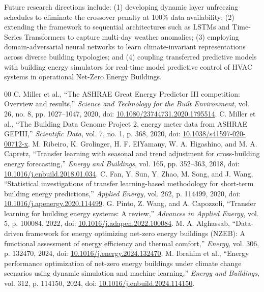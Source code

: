 \documentclass[conference]{IEEEtran}
\begin{document}
Future research directions include: (1) developing dynamic layer unfreezing schedules to eliminate the crossover penalty at 100\% data availability; (2) extending the framework to sequential architectures such as LSTMs and Time-Series Transformers to capture multi-day weather anomalies; (3) employing domain-adversarial neural networks to learn climate-invariant representations across diverse building typologies; and (4) coupling transferred predictive models with building energy simulators for real-time model predictive control of HVAC systems in operational Net-Zero Energy Buildings.

\small
\begin{thebibliography}{00}
 C. Miller et al., ``The ASHRAE Great Energy Predictor III competition: Overview and results,'' \textit{Science and Technology for the Built Environment}, vol. 26, no. 8, pp. 1027--1047, 2020, doi: \href{https://doi.org/10.1080/23744731.2020.1795514}{10.1080/23744731.2020.1795514}.
 C. Miller et al., ``The Building Data Genome Project 2, energy meter data from ASHRAE GEPIII,'' \textit{Scientific Data}, vol. 7, no. 1, p. 368, 2020, doi: \href{https://doi.org/10.1038/s41597-020-00712-x}{10.1038/s41597-020-00712-x}.
 M. Ribeiro, K. Grolinger, H. F. ElYamany, W. A. Higashino, and M. A. Capretz, ``Transfer learning with seasonal and trend adjustment for cross-building energy forecasting,'' \textit{Energy and Buildings}, vol. 165, pp. 352--363, 2018, doi: \href{https://doi.org/10.1016/j.enbuild.2018.01.034}{10.1016/j.enbuild.2018.01.034}.
 C. Fan, Y. Sun, Y. Zhao, M. Song, and J. Wang, ``Statistical investigations of transfer learning-based methodology for short-term building energy predictions,'' \textit{Applied Energy}, vol. 262, p. 114499, 2020, doi: \href{https://doi.org/10.1016/j.apenergy.2020.114499}{10.1016/j.apenergy.2020.114499}.
 G. Pinto, Z. Wang, and A. Capozzoli, ``Transfer learning for building energy systems: A review,'' \textit{Advances in Applied Energy}, vol. 5, p. 100084, 2022, doi: \href{https://doi.org/10.1016/j.adapen.2022.100084}{10.1016/j.adapen.2022.100084}.
 M. A. Alghassab, ``Data-driven framework for energy optimizing net-zero energy buildings (NZEB): A functional assessment of energy efficiency and thermal comfort,'' \textit{Energy}, vol. 306, p. 132470, 2024, doi: \href{https://doi.org/10.1016/j.energy.2024.132470}{10.1016/j.energy.2024.132470}.
 M. Ibrahim et al., ``Energy performance optimization of net-zero energy buildings under climate change scenarios using dynamic simulation and machine learning,'' \textit{Energy and Buildings}, vol. 312, p. 114150, 2024, doi: \href{https://doi.org/10.1016/j.enbuild.2024.114150}{10.1016/j.enbuild.2024.114150}.

\end{thebibliography}
\end{document}
